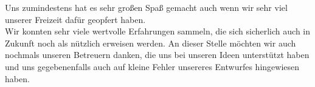 \documentclass{scrartcl}
\begin{document}



	Uns zumindestens hat es sehr großen Spaß gemacht auch wenn wir sehr viel unserer Freizeit dafür geopfert haben. \\
	Wir konnten sehr viele wertvolle Erfahrungen sammeln, die sich sicherlich auch in Zukunft noch als nützlich erweisen werden. 	
	An dieser Stelle möchten wir auch nochmals unseren Betreuern danken, die uns bei unseren Ideen unterstützt haben und uns gegebenenfalls auch auf kleine Fehler unsereres Entwurfes hingewiesen haben. \\
     
\end{document}
